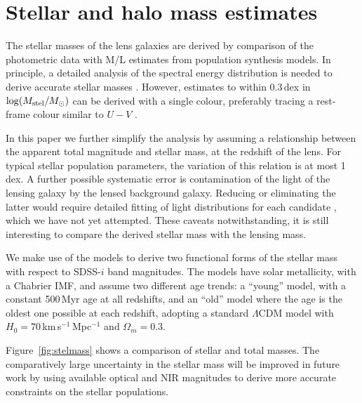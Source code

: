 \section{Stellar and halo mass estimates}\label{sec:stellar-mass}

The stellar masses of the lens galaxies are derived by comparison of
the photometric data with M/L estimates from population synthesis
models.  In principle, a detailed analysis of the spectral energy
distribution is needed to derive accurate stellar masses
\citep[e.g.][]{2009ApJS..185..253G,2011MNRAS.418.1587T}.  However,
estimates to within 0.3\,dex in $\log(M_\text{stel}/M_\odot)$ can be derived
with a single colour, preferably tracing a rest-frame colour similar
to $U-V$ \citep[see Fig.~1 of][]{2008MNRAS.383..857F}. 

In this paper we further simplify the analysis by assuming a
relationship between the apparent total magnitude and stellar mass, at
the redshift of the lens.  For typical stellar population parameters,
the variation of this relation is at most 1\,dex.  A further possible
systematic error is contamination of the light of the lensing galaxy
by the lensed background galaxy.  Reducing or eliminating the latter would
require detailed fitting of light distributions for each candidate
\citep[see][]{2011ApJ...740...97L}, which we have not yet attempted.  These 
caveats notwithstanding, it is still interesting to compare the derived
stellar mass with the lensing mass.

We make use of the \citet{2003MNRAS.344.1000B} models to derive two
functional forms of the stellar mass with respect to SDSS-$i$ band
magnitudes. The models have solar metallicity, with a Chabrier IMF,
and assume two different age trends: a ``young'' model, with a
constant 500\,Myr age at all redshifts, and an ``old'' model where the
age is the oldest one possible at each redshift, adopting a standard
$\Lambda$CDM model with $H_0=70$\,km\,s$^{-1}$\,Mpc$^{-1}$ and
$\Omega_m=0.3$.

Figure~\ref{fig:stelmass} shows a comparison of stellar and total
masses.  The comparatively large uncertainty in the stellar mass will
be improved in future work by using available optical and NIR
magnitudes to derive more accurate constraints on the stellar
populations.

